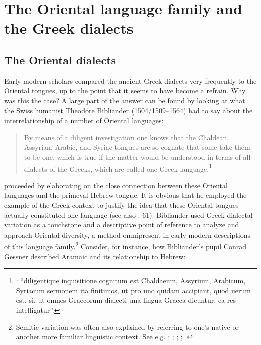 \section{The Oriental language family and the Greek dialects}\label{sec:8.3}
\subsection{The Oriental dialects}\label{sec:8.3.1}

Early modern scholars compared the ancient Greek dialects very frequently to the Oriental tongues, up to the point that it seems to have become a refrain. Why was this the case? A large part of the answer can be found by looking at what the Swiss humanist Theodore Bibliander (1504/1509–1564) had to say about the interrelationship of a number of Oriental languages:

\begin{quote}
By means of a diligent investigation one knows that the Chaldean, Assyrian, Arabic, and Syriac tongues are so cognate that some take them to be one, which is true if the matter would be understood in terms of all dialects of the Greeks, which are called one Greek language.\footnote{\citet[58]{Bibliander1542}: “diligentique inquisitione cognitum est Chaldaeum, Assyrium, Arabicum, Syriacum sermonem ita finitimos, ut pro uno quidam accipiant, quod uerum est, si, ut omnes Graecorum dialecti una lingua Graeca dicuntur, ea res intelligatur”.}
\end{quote}

\citet[58--59]{Bibliander1542} proceeded by elaborating on the close connection between these Oriental languages and the primeval Hebrew tongue. It is obvious that he employed the example of the Greek context to justify the idea that these Oriental tongues actually constituted one language (see also \citealt{Metcalf2013}: 61). Bibliander used Greek dialectal variation as a touchstone and a descriptive point of reference to analyze and approach Oriental diversity, a method omnipresent in early modern descriptions of this language family.\footnote{Semitic variation was often also explained by referring to one’s native or another more familiar linguistic context. See e.g. \citet[41]{Purchas1613}; \citet[197]{Kircher1679}; \citet[b.1\textsc{\textsuperscript{v}}]{Le1696}; \citet[\textsc{i.}230, 4th sequence of pagination]{Chambers1728}; \citet[57--58]{Kals1752}.} Consider, for instance, how Bibliander’s pupil Conrad Gessner described Aramaic and its relationship to Hebrew:

